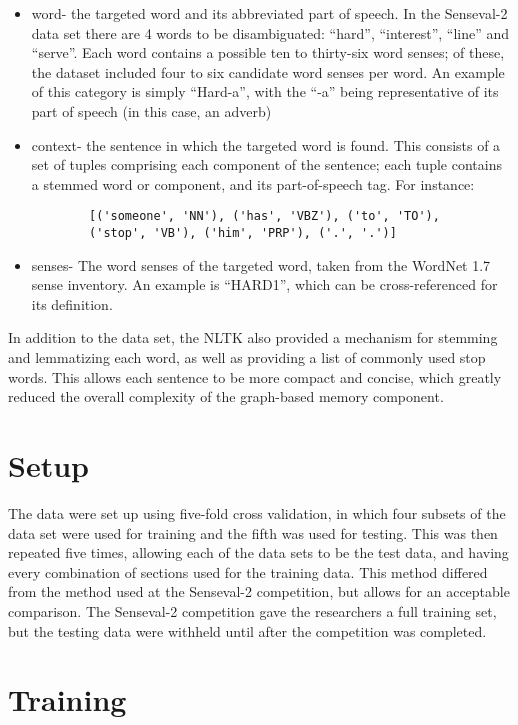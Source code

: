 \begin{itemize}     
	\item word- the targeted word and its abbreviated part of speech. In the 
	Senseval-2 data set there are 4 words to be disambiguated: ``hard'', 
	``interest'', ``line'' and ``serve''.  Each word contains a possible ten to thirty-six 
    word senses; of these, the dataset included four to six candidate word senses per word. 
    An example of this category is simply
	``Hard-a'', with the ``-a'' being representative of its part of speech (in 
	this case, an adverb)
	\item context- the sentence in which the targeted word is found. This consists of 
	a set of tuples comprising each component of the sentence; each tuple 
	contains a stemmed word or component, and its part-of-speech tag. For 
	instance: 
	\begin{verbatim}
		[('someone', 'NN'), ('has', 'VBZ'), ('to', 'TO'), 
		('stop', 'VB'), ('him', 'PRP'), ('.', '.')] 
	\end{verbatim}

	\item senses- The word senses of the targeted word, taken from the WordNet 
	1.7 sense inventory. An example is ``HARD1'', which can be cross-referenced 
	for its definition. 
\end{itemize}

In addition to the data set, the NLTK also provided a mechanism for stemming and
lemmatizing each word, as well as providing a list of commonly used stop words.
This allows each sentence to be more compact and concise, which greatly reduced
the overall complexity of the graph-based memory component.

\section{Setup}

The data were set up using five-fold cross validation, in which four subsets of
the data set were used for training and the fifth was used for testing. This
was then repeated five times, allowing each of the data sets to be the test
data, and having every combination of sections used for the training data.  This method
differed from the method used at the Senseval-2 competition, but allows for an
acceptable comparison.  The Senseval-2 competition gave the researchers a full
training set, but the testing data were withheld until after the competition was completed.   

\section{Training}

